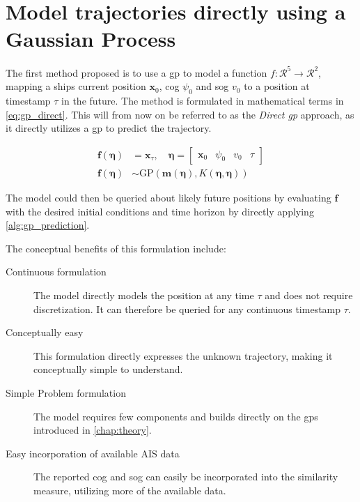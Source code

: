\chapter{Model trajectories directly using a Gaussian Process}\label{chap:direct_gp}
The first method proposed is to use a \acrshort{gp} to model a function $f: \mathcal{R}^5 \to \mathcal{R}^2$, mapping a ships current position $\boldsymbol{x}_0$, \acrshort{cog} $\psi_0$ and \acrshort{sog} $v_0$ to a position at timestamp $\tau$ in the future. The method is formulated in mathematical terms in \cref{eq:gp_direct}. This will from now on be referred to as the \textit{Direct \acrshort{gp}} approach, as it directly utilizes a \acrshort{gp} to predict the trajectory. 

\begin{subequations}\label{eq:gp_direct}
\begin{align}
    \boldsymbol{f}(\boldsymbol{\eta}) &= \boldsymbol{x}_{\tau} \label{eq:gp_direct_f}, \quad \boldsymbol{\eta} = \begin{bmatrix} \boldsymbol{x}_0 & \psi_0 & v_0 & \tau\end{bmatrix}\\
    \boldsymbol{f}(\boldsymbol{\eta}) &\sim \text{GP}(\boldsymbol{m}(\boldsymbol{\eta}), K(\boldsymbol{\eta}, \boldsymbol{\eta}))\label{eq:gp_direct_f_dist}
\end{align} 
\end{subequations}

The model could then be queried about likely future positions by evaluating $\boldsymbol{f}$ with the desired initial conditions and time horizon by directly applying \cref{alg:gp_prediction}. 

The conceptual benefits of this formulation include:
\begin{description}
    \item[Continuous formulation] The model directly models the position at any time $\tau$ and does not require discretization. It can therefore be queried for any continuous timestamp $\tau$.
    \item[Conceptually easy] This formulation directly expresses the unknown trajectory, making it conceptually simple to understand.
    \item[Simple Problem formulation] The model requires few components and builds directly on the \acrshort{gp}s introduced in \cref{chap:theory}.
    \item[Easy incorporation of available AIS data] The reported \acrshort{cog} and \acrshort{sog} can easily be incorporated into the similarity measure, utilizing more of the available data.
\end{description}

